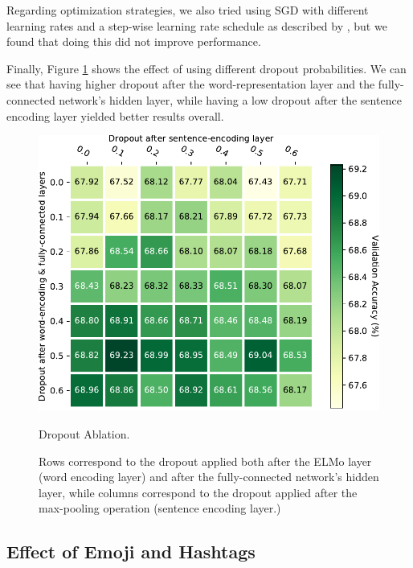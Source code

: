\documentclass[11pt,a4paper]{article}
\begin{document}
Regarding optimization strategies, we also tried using SGD with different learning rates and a step-wise learning rate schedule as described by \citet{conneau2018}, but we found that doing this did not improve performance. 

Finally, Figure \ref{fig:dropouts} shows the effect of using different dropout
probabilities. We can see that having higher dropout after the
word-representation layer and the fully-connected network's hidden layer, while
having a low dropout after the sentence encoding layer yielded better results
overall. 

\begin{figure}[!h]
    \centering
    \includegraphics[width=\columnwidth]{images/dropout_table.pdf}

    \caption{Dropout Ablation. }
    \vspace{-0.4cm}

    \caption*{
        \footnotesize Rows correspond to the dropout applied both after
        the ELMo layer (word encoding layer) and after the fully-connected network's
        hidden layer, while columns correspond to the dropout applied after the
        max-pooling operation (sentence encoding layer.)}

\label{fig:dropouts}
\end{figure}

\subsection{Effect of Emoji and Hashtags}%
\label{sub:effect_of_emoji_and_hashtags}
\end{document}
